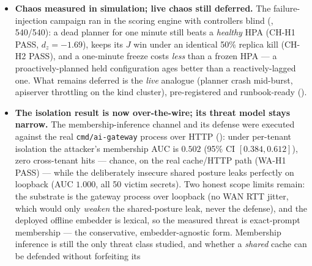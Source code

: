 \begin{itemize}
        aggregate workload streams, not per-tenant SaaS demand. The
        extrapolation is now measured one level down
        (): the same traces split
        by Model\,$\times$\,Log-Type into 19 sub-streams reproduce the
        boundary with zero counterexamples (PT-H1), every periodic sub-stream
        shows the seasonal win (PT-H2), and three different forecasters win
        across sub-streams (PT-H3) --- exactly what a pluggable per-tenant
        forecasting layer exists to exploit. True per-tenant SaaS series
        remain unavailable, and that limit stands.
  \item \textbf{Chaos measured in simulation; live chaos still deferred.}
        The failure-injection campaign ran in the scoring engine with
        controllers blind (,
        540/540): a dead planner for one minute still beats a \emph{healthy}
        HPA (CH-H1 PASS, $d_z{=}{-}1.69$), \jcac{} keeps its $J$ win under an
        identical 50\% replica kill (CH-H2 PASS), and a one-minute freeze
        costs \jcac{} \emph{less} than a frozen HPA --- a proactively-planned
        held configuration ages better than a reactively-lagged one. What
        remains deferred is the \emph{live} analogue (planner crash mid-burst,
        apiserver throttling on the kind cluster), pre-registered and
        runbook-ready ().
  \item \textbf{The isolation result is now over-the-wire; its threat model
        stays narrow.} The membership-inference channel and its defense were
        executed against the real \texttt{cmd/ai-gateway} process over HTTP
        (): under
        per-tenant isolation the attacker's membership AUC is $0.502$ (95\% CI
        $[0.384, 0.612]$), zero cross-tenant hits --- chance, on the real
        cache/HTTP path (WA-H1 PASS) --- while the deliberately insecure
        shared posture leaks perfectly on loopback (AUC $1.000$, all 50 victim
        secrets). Two honest scope limits remain: the substrate is the gateway
        process over loopback (no WAN RTT jitter, which would only
        \emph{weaken} the shared-posture leak, never the defense), and the
        deployed offline embedder is lexical, so the measured threat is
        exact-prompt membership --- the conservative, embedder-agnostic form.
        Membership inference is still the only threat class studied, and
        whether a \emph{shared} cache can be defended without forfeiting its

\end{itemize}
